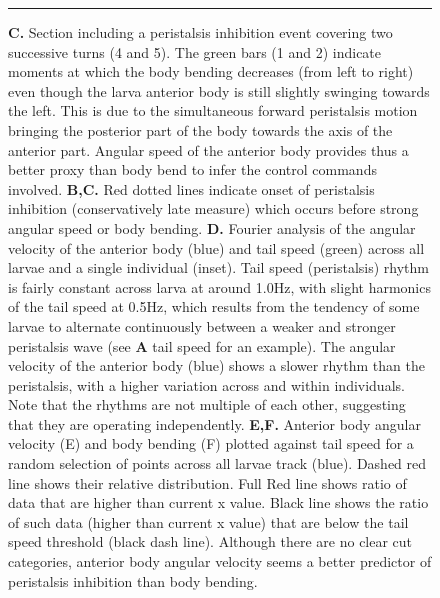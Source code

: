 \documentclass[11pt,a4paper]{article}
\newcommand{\todoBW}[1]{\todo[author=BW,color=orange, size=\tiny,inline]{1}}
\begin{document}
\begin{figure}
\ContinuedFloat
\caption{
{\bf C.} Section including a peristalsis inhibition event covering two successive turns (4 and 5). The green bars (1 and 2) indicate moments at which the body bending decreases (from left to right) even though the larva anterior body is still slightly swinging towards the left. This is due to the simultaneous forward peristalsis motion bringing the posterior part of the body towards the axis of the anterior part. Angular speed of the anterior body provides thus a better proxy than body bend to infer the control commands involved.
 {\bf B,C.} Red dotted lines indicate onset of peristalsis inhibition (conservatively late measure) which occurs before strong angular speed or body bending. {\bf D.} Fourier analysis of the angular velocity of the anterior body (blue) and tail speed (green) across all larvae and a single individual (inset). Tail speed (peristalsis) rhythm is fairly constant across larva at around 1.0Hz, with slight harmonics of the tail speed at 0.5Hz, which results from the tendency of some larvae to alternate continuously between a weaker and stronger peristalsis wave (see {\bf A} tail speed for an example). The angular velocity of the anterior body (blue) shows a slower rhythm than the peristalsis, with a higher variation across and within individuals. Note that the rhythms are not multiple of each other, suggesting that they are operating independently.
{\bf  E,F.} Anterior body angular velocity (E) and body bending (F) plotted against tail speed for a random selection of points across all larvae track (blue). Dashed red line shows their relative distribution.
 Full Red line shows ratio of data that are higher than current x value. Black line shows the ratio of such data (higher than current x value) that are below the tail speed threshold (black dash line). Although there are no clear cut categories, anterior body angular velocity seems a better predictor of peristalsis inhibition than body bending.
}
\hrule
\end{figure}
\end{document}
